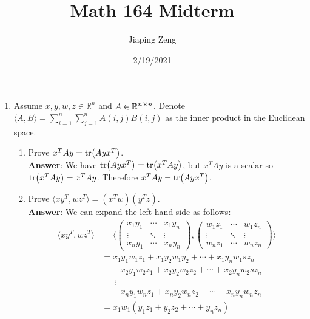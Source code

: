\documentclass{article}
\title{Math 164 Midterm}
\date{2/19/2021}
\author{Jiaping Zeng}
\begin{document}

\begin{enumerate}
    \item Assume $x,y,w,z\in\mathbb{R}^n$ and $A\in\mathbb{R}^{n\cross n}$. Denote $\langle A,B\rangle=\sum_{i=1}^n\sum_{j=1}^n A(i,j)B(i,j)$ as the inner product in the Euclidean space.
          \begin{enumerate}
              \item Prove $x^TAy=\tr(Ayx^T)$.\\
                    \textbf{Answer}: We have $\tr(Ayx^T)=\tr(x^TAy)$, but $x^TAy$ is a scalar so $\tr(x^TAy)=x^TAy$. Therefore $x^TAy=\tr(Ayx^T)$.
              \item Prove $\langle xy^T,wz^T\rangle=(x^Tw)(y^Tz)$.\\
                    \textbf{Answer}: We can expand the left hand side as follows:
                    \begin{align*}
                        \langle xy^T,wz^T\rangle & =\langle\begin{pmatrix}
                            x_1y_1 & \cdots & x_1y_n \\
                            \vdots & \ddots & \vdots \\
                            x_ny_1 & \cdots & x_ny_n
                        \end{pmatrix},\begin{pmatrix}
                            w_1z_1 & \cdots & w_1z_n \\
                            \vdots & \ddots & \vdots \\
                            w_nz_1 & \cdots & w_nz_n
                        \end{pmatrix}\rangle \\
                                                 & =x_1y_1w_1z_1+x_1y_2w_1y_2+\cdots+x_1y_nw_1sz_n                    \\
                                                 & \quad+x_2y_1w_2z_1+x_2y_2w_2z_2+\cdots+x_2y_nw_2sz_n               \\
                                                 & \quad\;\:\vdots                                                    \\
                                                 & \quad+x_ny_1w_nz_1+x_ny_2w_nz_2+\cdots+x_ny_nw_nz_n                \\
                                                 & =x_1w_1(y_1z_1+y_2z_2+\cdots+y_nz_n)                               \\

\end{align*}
\end{enumerate}
\end{enumerate}
\end{document}
